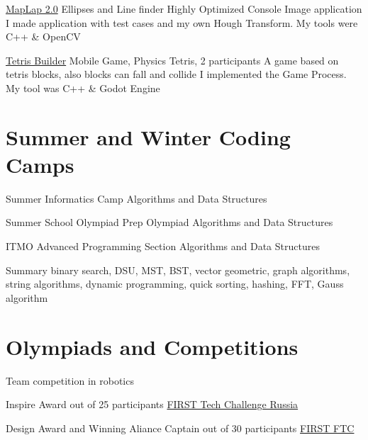 \documentclass[12pt,a4paper]{moderncv}
\begin{document}
            {\href{https://github.com/a-alex-l/MapLap_2} {MapLap 2.0}} {Ellipses and Line finder}
            {\newline Highly Optimized Console Image application} {}
            {I made application with test cases and my own Hough Transform. My tools were \textcolor{Attention} {C++ \& OpenCV}}
        
            {\href{https://github.com/a-alex-l/TetrisBuilder} {Tetris Builder}} {Mobile Game, Physics Tetris, 2 participants}
            {\newline A game based on tetris blocks, also blocks can fall and collide} {}
            {I implemented the Game Process. My tool was \textcolor{Attention} {C++ \& Godot Engine} }
        
    \section{Summer and Winter Coding Camps}
        
         {Summer Informatics Camp} {}{} {Algorithms and Data Structures} {}
        
         {Summer School Olympiad Prep} {}{} {Olympiad Algorithms and Data Structures} {}
        
         {ITMO Advanced Programming Section} {}{} {Algorithms and Data Structures} {}
        
        \cventry{} {Summary} {}{} { binary search, DSU, MST, BST, vector geometric, graph algorithms, string algorithms, dynamic programming, quick sorting, hashing, FFT, Gauss algorithm} {}
    
    \section{Olympiads and Competitions}
    
        \cventry{} {Team competition in robotics} {} {} {} {}
    
         {Inspire Award out of 25 participants}
            {\href {https://www.spbstu.ru/media/news/achievements/team-school-engineers-future-russia-winner-championship-robotics/} {FIRST Tech Challenge Russia}} {} {} {}
        
         {Design Award and Winning Aliance Captain out of 30 participants}
            {\href {https://www.spbstu.ru/media/news/achievements/team-polytechnic-quota-world-championship-robotics-usa/}
            {FIRST FTC}} {} {} {}
            
\end{document}
